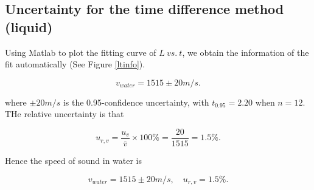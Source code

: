 \subsection{Uncertainty for the time difference method (liquid)}

    Using Matlab to plot the fitting curve of $L\ vs.\ t$, we obtain the
    information of the fit automatically (See Figure \ref{ltinfo}).  

    \[
        v_{water}=1515\pm20 m/s. 
    \]

    where $\pm 20m/s$ is the 0.95-confidence uncertainty, with $t_{0.95}=2.20$
    when $n=12$. THe relative uncertainty is that 

    \[
        u_{r,v}=\frac{u_v}{\bar{v}}\times100\%=\frac{20}{1515}=1.5\%. 
    \]

    Hence the speed of sound in water is 

    \[
        v_{water}=1515\pm20m/s,\quad u_{r,v}=1.5\%. 
    \]